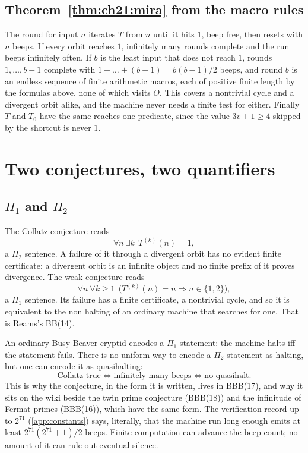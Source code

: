 \subsection{Theorem~\ref{thm:ch21:mira} from the macro rules}

The round for input $n$ iterates $T$ from $n$ until it hits $1$, beep free, then resets with $n$ beeps. If every orbit reaches $1$, infinitely many rounds complete and the run beeps infinitely often. If $b$ is the least input that does not reach $1$, rounds $1,\dots,b-1$ complete with $1+\dots+(b-1)=b(b-1)/2$ beeps, and round $b$ is an endless sequence of finite arithmetic macros, each of positive finite length by the formulas above, none of which visits $O$. This covers a nontrivial cycle and a divergent orbit alike, and the machine never needs a finite test for either. Finally $T$ and $T_0$ have the same reaches one predicate, since the value $3v+1\ge 4$ skipped by the shortcut is never $1$.

\section{Two conjectures, two quantifiers}\label{sec:ch21:quantifiers}

\subsection{$\Pi_1$ and $\Pi_2$}

The Collatz conjecture reads
\[
\forall n\ \exists k\ \ T^{(k)}(n)=1,
\]
a $\Pi_2$ sentence. A failure of it through a divergent orbit has no evident finite certificate: a divergent orbit is an infinite object and no finite prefix of it proves divergence. The weak conjecture reads
\[
\forall n\ \forall k\ge 1\ \ \bigl(T^{(k)}(n)=n \Rightarrow n\in\{1,2\}\bigr),
\]
a $\Pi_1$ sentence. Its failure has a finite certificate, a nontrivial cycle, and so it is equivalent to the non halting of an ordinary machine that searches for one. That is Reams's BB(14).

An ordinary Busy Beaver cryptid encodes a $\Pi_1$ statement: the machine halts iff the statement fails. There is no uniform way to encode a $\Pi_2$ statement as halting, but one can encode it as quasihalting:
\[
\text{Collatz true} \iff \text{infinitely many beeps} \iff \text{no quasihalt}.
\]
This is why the conjecture, in the form it is written, lives in BBB(17), and why it sits on the wiki beside the twin prime conjecture (BBB(18)) and the infinitude of Fermat primes (BBB(16)), which have the same form. The verification record up to $2^{71}$ (\cref{app:constants}) says, literally, that the machine run long enough emits at least $2^{71}(2^{71}+1)/2$ beeps. Finite computation can advance the beep count; no amount of it can rule out eventual silence.

